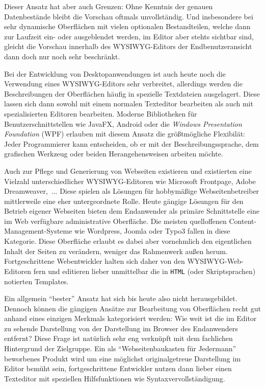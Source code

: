 Dieser Ansatz hat aber auch Grenzen: Ohne Kenntnis der genauen Datenbestände bleibt die Vorschau oftmals unvollständig. Und insbesondere bei sehr dynamische Oberflächen mit vielen optionalen Bestandteilen, welche dann zur Laufzeit ein- oder ausgeblendet werden, im Editor aber stehts sichtbar sind, gleicht die Vorschau innerhalb des WYSIWYG-Editors der Endbenutzeransicht dann doch nur noch sehr beschränkt.

Bei der Entwicklung von Desktopanwendungen ist auch heute noch die Verwendung eines WYSIWYG-Editors sehr verbreitet, allerdings werden die Beschreibungen der Oberflächen häufig in spezielle Textdateien ausgelagert. Diese lassen sich dann sowohl mit einem normalen Texteditor bearbeiten als auch mit spezialisierten Editoren bearbeiten. Moderne Bibliotheken für Benutzerschnittstellen wie JavaFX, Android oder die \textit{Windows Presentation Foundation} (WPF) erlauben mit diesem Ansatz die größtmögliche Flexibilät: Jeder Programmierer kann entscheiden, ob er mit der Beschreibungssprache, dem grafischen Werkzeug oder beiden Herangehensweisen arbeiten möchte.

Auch zur Pflege und Generierung von Webseiten existieren und existierten eine Vielzahl unterschiedlicher WYSIWYG-Editoren wie Microsoft Frontpage, Adobe Dreamweaver,~... Diese spielen als Lösungen für hobbymäßige Webseitenbetreiber mittlerweile eine eher untergeordnete Rolle. Heute gängige Lösungen für den Betrieb eigener Webseiten bieten dem Endanwender als primäre Schnittstelle eine im Web verfügbare administrative Oberfläche. Die meisten quelloffenen Content-Management-Systeme wie Wordpress, Joomla oder Typo3 fallen in diese Kategorie. Diese Oberfläche erlaubt es dabei aber vornehmlich den eigentlichen Inhalt der Seiten zu verändern, weniger das Rahmenwerk außen herum. Fortgeschrittene Webentwickler halten sich daher von den WYSIWYG-Web-Editoren fern und editieren lieber unmittelbar die in \texttt{HTML} (oder Skriptsprachen) notierten Templates.

Ein allgemein "`bester"' Ansatz hat sich bis heute also nicht herausgebildet. Dennoch können die gängigen Ansätze zur Bearbeitung von Oberflächen recht gut anhand eines einzigen Merkmals kategorisiert werden: Wie weit ist die im Editor zu sehende Darstellung von der Darstellung im Browser des Endanwenders entfernt? Diese Frage ist natürlich sehr eng verknüpft mit dem fachlichen Hintergrund der Zielgruppe. Ein als "`Webseitenbaukasten für Jedermann"' beworbenes Produkt wird um eine möglichst originalgetreue Darstellung im Editor bemüht sein, fortgeschrittene Entwickler nutzen dann lieber einen Texteditor mit speziellen Hilfsfunktionen wie Syntaxvervollständigung.

